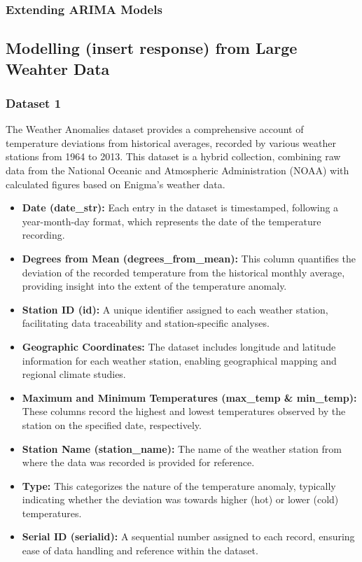 \documentclass[12pt, twoside,hidelinks]{article}
\theoremstyle{definition}
\numberwithin{equation}{section}
\begin{document}
\subsubsection{Extending ARIMA Models}



\subsection{Modelling (insert response) from Large Weahter Data}


\subsubsection*{Dataset 1}


The Weather Anomalies dataset provides a comprehensive account of temperature deviations from historical averages, recorded by various weather stations from 1964 to 2013. This dataset is a hybrid collection, combining raw data from the National Oceanic and Atmospheric Administration (NOAA) with calculated figures based on Enigma's weather data.

\begin{itemize}
    \item \textbf{Date (date\_str):} Each entry in the dataset is timestamped, following a year-month-day format, which represents the date of the temperature recording.
    
    \item \textbf{Degrees from Mean (degrees\_from\_mean):} This column quantifies the deviation of the recorded temperature from the historical monthly average, providing insight into the extent of the temperature anomaly.
    
    \item \textbf{Station ID (id):} A unique identifier assigned to each weather station, facilitating data traceability and station-specific analyses.
    
    \item \textbf{Geographic Coordinates:} The dataset includes longitude and latitude information for each weather station, enabling geographical mapping and regional climate studies.
    
    \item \textbf{Maximum and Minimum Temperatures (max\_temp \& min\_temp):} These columns record the highest and lowest temperatures observed by the station on the specified date, respectively.
    
    \item \textbf{Station Name (station\_name):} The name of the weather station from where the data was recorded is provided for reference.
    
    \item \textbf{Type:} This categorizes the nature of the temperature anomaly, typically indicating whether the deviation was towards higher (hot) or lower (cold) temperatures.
    
    \item \textbf{Serial ID (serialid):} A sequential number assigned to each record, ensuring ease of data handling and reference within the dataset.
\end{itemize}
\end{document}
